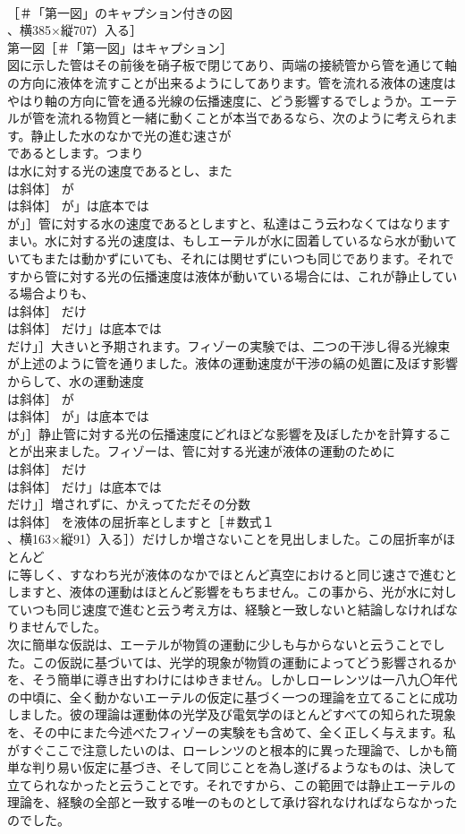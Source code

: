 \documentclass[8pt]{extreport}
\begin{document}
\begin{CJK}{UTF8}{min}
\\	［＃「第一図」のキャプション付きの図
\\	、横385×縦707）入る］
\\	第一図［＃「第一図」はキャプション］
\\	図に示した管はその前後を硝子板で閉じてあり、両端の接続管から管を通じて軸の方向に液体を流すことが出来るようにしてあります。管を流れる液体の速度はやはり軸の方向に管を通る光線の伝播速度に、どう影響するでしょうか。エーテルが管を流れる物質と一緒に動くことが本当であるなら、次のように考えられます。静止した水のなかで光の進む速さが 
\\	であるとします。つまり 
\\	は水に対する光の速度であるとし、また 
\\	は斜体］ が
\\	は斜体］ が」は底本では
\\	が」］管に対する水の速度であるとしますと、私達はこう云わなくてはなりますまい。水に対する光の速度は、もしエーテルが水に固着しているなら水が動いていてもまたは動かずにいても、それには関せずにいつも同じであります。それですから管に対する光の伝播速度は液体が動いている場合には、これが静止している場合よりも、
\\	は斜体］ だけ
\\	は斜体］ だけ」は底本では
\\	だけ」］大きいと予期されます。フィゾーの実験では、二つの干渉し得る光線束が上述のように管を通りました。液体の運動速度が干渉の縞の処置に及ぼす影響からして、水の運動速度 
\\	は斜体］ が
\\	は斜体］ が」は底本では
\\	が」］静止管に対する光の伝播速度にどれほどな影響を及ぼしたかを計算することが出来ました。フィゾーは、管に対する光速が液体の運動のために 
\\	は斜体］ だけ
\\	は斜体］ だけ」は底本では
\\	だけ」］増されずに、かえってただその分数
\\	は斜体］ を液体の屈折率としますと［＃数式１
\\	、横163×縦91）入る］）だけしか増さないことを見出しました。この屈折率がほとんど 
\\	に等しく、すなわち光が液体のなかでほとんど真空におけると同じ速さで進むとしますと、液体の運動はほとんど影響をもちません。この事から、光が水に対していつも同じ速度で進むと云う考え方は、経験と一致しないと結論しなければなりませんでした。
\\	次に簡単な仮説は、エーテルが物質の運動に少しも与からないと云うことでした。この仮説に基づいては、光学的現象が物質の運動によってどう影響されるかを、そう簡単に導き出すわけにはゆきません。しかしローレンツは一八九〇年代の中頃に、全く動かないエーテルの仮定に基づく一つの理論を立てることに成功しました。彼の理論は運動体の光学及び電気学のほとんどすべての知られた現象を、その中にまた今述べたフィゾーの実験をも含めて、全く正しく与えます。私がすぐここで注意したいのは、ローレンツのと根本的に異った理論で、しかも簡単な判り易い仮定に基づき、そして同じことを為し遂げるようなものは、決して立てられなかったと云うことです。それですから、この範囲では静止エーテルの理論を、経験の全部と一致する唯一のものとして承け容れなければならなかったのでした。

\end{CJK}
\end{document}
